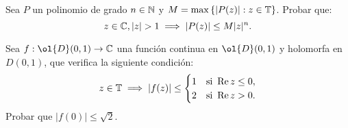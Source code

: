 \begin{ejercicio}
    Sea $P$ un polinomio de grado $n\in \mathbb{N}$ y $M = \max\left\{ |P(z)| : z\in \mathbb{T} \right\}$. Probar que:
    \begin{equation*}
        z\in \mathbb{C}, |z| > 1 \implies |P(z)| \leq M |z|^n.
    \end{equation*}

    \begin{comment}
    Sea $P$ un polinomio de grado $n\in \bb{N}$, no constante. Entonces, se puede escribir como:
    \begin{equation*}
        P(z) = a_n z^n + a_{n-1} z^{n-1} + \ldots + a_0 = \sum_{k=0}^n a_k z^k.
    \end{equation*}

    Aplicamos la propiedad de la media. Para todo $r\in \bb{R}^+$, se tiene que:
    \begin{align*}
        P(z) &= \frac{1}{2\pi} \int_{-\pi}^{\pi} P\left( r e^{i\theta} \right) \, d\theta \\
        &= \frac{1}{2\pi} \int_{-\pi}^{\pi} \sum_{k=0}^n a_k \left( r e^{i\theta} \right)^k \, d\theta \\
        &= \frac{1}{2\pi} \int_{-\pi}^{\pi} \sum_{k=0}^n a_k r^k \left(e^{i\theta} \right)^k \, d\theta
    \end{align*}

    Por tanto:
    \begin{align*}
        |P(z)| & \leq \frac{1}{2\pi} \int_{-\pi}^{\pi} \sum_{k=0}^n |a_k| |r^k| \left|e^{i\theta} \right|^k  \, d\theta \\
        &\leq \frac{1}{2\pi} \int_{-\pi}^{\pi} \sum_{k=0}^n |a_k| |r^k| \left|e^{i\theta} \right|^k  \, d\theta \\
    \end{align*}
    \end{comment}
\end{ejercicio}

\begin{ejercicio}
    Sea $f : \ol{D}(0,1) \to \bb{C}$ una función continua en $\ol{D}(0,1)$ y holomorfa en $D(0,1)$, que verifica la siguiente condición:
    \begin{equation*}
        z\in \mathbb{T} \implies |f(z)| \leq
        \begin{cases}
            1 & \text{si } \operatorname{Re} z \leq 0,\\
            2 & \text{si } \operatorname{Re} z > 0.
        \end{cases}
    \end{equation*}
    Probar que $|f(0)| \leq \sqrt{2}$.
\end{ejercicio}


